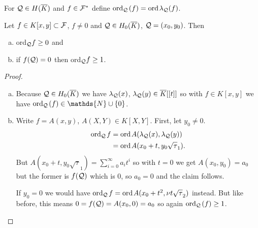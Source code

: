 \documentclass[english,11pt,a4paper]{article}
\begin{document}
\vspace{-3mm}
\fline
\vspace{-3mm}
\begin{defin}\label{def-ord}
   For $\mathcal{Q} \in H(\overline K)$ and $f \in \mathcal{F}^*$ define $\text{ord}_{\mathcal{Q}}\hspace{0.4mm} (f) = \text{ord\hspace{0.4mm}} \lambda_{\mathcal{Q}} (f)$.
\end{defin}
\vspace{-5.5mm}
\fline


\begin{lemma}\label{one}
  Let $f \in K[x,y] \subset \mathcal{F}$, $f \neq 0$ and $\mathcal{Q} \in H_0(\overline K)$, $\mathcal{Q} = (x_0,y_0)$. Then
  \begin{enumerate}[(a)]\parskip 1mm
    \item ord$_{\mathcal{Q}} f \geq 0$ and
    \item if $f(\mathcal{Q}) = 0$ then ord$_{\mathcal{Q}} f \geq 1$.
  \end{enumerate}\parskip 3mm
  \begin{proof}\hfill
    \begin{enumerate}[(a)]\parskip 1mm
      \item Because $\mathcal{Q} \in H_0(\overline K)$ we have $\lambda_{\mathcal{Q}}(x)$, $\lambda_{\mathcal{Q}}(y) \in \overline K[[t]]$ so with $f \in K[x,y]$ we have $\ordq (f) \in \mathds{N} \cup \{0\}$.
      \item Write $f = A(x,y)$, $A(X,Y) \in K[X,Y]$. First, let $y_0 \neq 0$.
      \begin{align*}
        \text{ord}_{\mathcal{Q}}\hspace{0.4mm} f &= \text{ord\hspace{0.4mm}} A(\lambda_{\mathcal{Q}}(x), \lambda_{\mathcal{Q}}(y))\\
        &= \text{ord\hspace{0.4mm}} A(x_0 + t, y_0 \sqrt \tau_1).
      \end{align*}
      But $A(x_0 + t, y_0 \sqrt \tau_1)=\sum_{i=0}^{\infty} a_i t^i$ so with $t=0$ we get $A(x_0, y_0)=a_0$ but the former is $f(\mathcal{Q})$ which is $0$, so $a_0 = 0$ and the claim follows.

      If $y_0 = 0$ we would have $\text{ord}_{\mathcal{Q}}\hspace{0.4mm} f = \text{ord\hspace{0.4mm}} A(x_0 + t^2, \nu t \sqrt \tau_2)$ instead. But like before, this means $0 = f(\mathcal{Q}) = A(x_0, 0) = a_0$ so again $\text{ord}_{\mathcal{Q}}\hspace{0.4mm} (f) \geq 1$.
    \end{enumerate}\parskip 3mm
  \end{proof}
\end{lemma}
\end{document}
